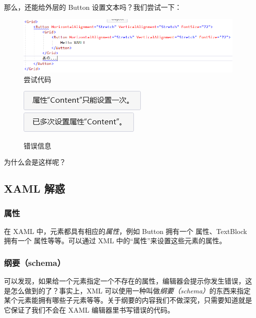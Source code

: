 那么，还能给外层的 Button 设置文本吗？我们尝试一下：
\begin{figure}[htbp]
    \centering
    \includegraphics[width = 0.5\paperwidth]{pic/19.png}
    \caption{尝试代码}
\end{figure}
\begin{figure}[htbp]
    \centering
    \includegraphics[width = 0.3\paperwidth]{pic/20.png}
    \includegraphics[width = 0.3\paperwidth]{pic/21.png}
    \caption{错误信息}
\end{figure}

为什么会是这样呢？

\subsection{XAML 解惑}

\subsubsection{属性}

在 XAML 中，元素都具有相应的\emph{属性}，例如 Button 拥有一个  属性、TextBlock 拥有一个  属性等等。可以通过 XML 中的``属性''来设置这些元素的属性。

\subsubsection{纲要（schema）}

可以发现，如果给一个元素指定一个不存在的属性，编辑器会提示你发生错误，这是怎么做到的了？事实上，XML 可以使用一种叫做\emph{纲要（schema）}的东西来指定某个元素能拥有哪些子元素等等。关于纲要的内容我们不做深究，只需要知道就是它保证了我们不会在 XAML 编辑器里书写错误的代码。

